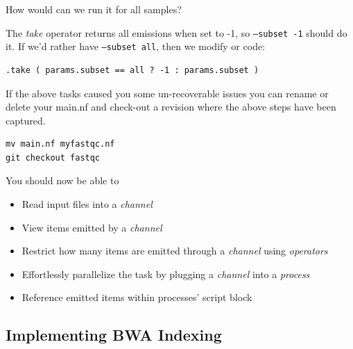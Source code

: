 \begin{bonus}
\begin{questions}
How would can we run it for all samples?
\begin{answer}
The \emph{take} operator returns all emissions when set to -1, 
so \texttt{--subset -1} should do it. If we'd rather have \texttt{--subset all},
then we modify or code: 
\begin{lstlisting}
.take ( params.subset == all ? -1 : params.subset ) 
\end{lstlisting}
\end{answer}
\end{questions}

\end{bonus}

\begin{note}
If the above tasks caused you some un-recoverable issues you can rename or delete your main.nf and check-out a revision where the above steps have been captured.
\begin{lstlisting}
mv main.nf myfastqc.nf
git checkout fastqc
\end{lstlisting}
\end{note}

You should now be able to 

\begin{itemize}
 \item Read input files into a \emph{channel}
 \item View items emitted by a \emph{channel}
 \item Restrict how many items are emitted through a \emph{channel} using \emph{operators}
 \item Effortlessly parallelize the task by plugging a \emph{channel} into a \emph{process}
 \item Reference emitted items within processes' script block
\end{itemize}

%
\subsection{Implementing BWA Indexing}


